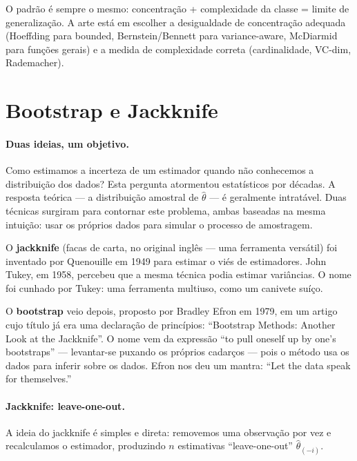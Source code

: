 \documentclass{tufte-handout}
\begin{document}
\begin{remark}
    O padrão é sempre o mesmo: concentração + complexidade da classe = limite de generalização. A arte está em escolher a desigualdade de concentração adequada (Hoeffding para bounded, Bernstein/Bennett para variance-aware, McDiarmid para funções gerais) e a medida de complexidade correta (cardinalidade, VC-dim, Rademacher).
\end{remark}

\section{Bootstrap e Jackknife}

\paragraph{Duas ideias, um objetivo.}

Como estimamos a incerteza de um estimador quando não conhecemos a distribuição dos dados? Esta pergunta atormentou estatísticos por décadas. A resposta teórica --- a distribuição amostral de $\hat{\theta}$ --- é geralmente intratável. Duas técnicas surgiram para contornar este problema, ambas baseadas na mesma intuição: usar os próprios dados para simular o processo de amostragem.

O \textbf{jackknife} (facas de carta, no original inglês --- uma ferramenta versátil) foi inventado por Quenouille em 1949 para estimar o viés de estimadores. John Tukey, em 1958, percebeu que a mesma técnica podia estimar variâncias. O nome foi cunhado por Tukey: uma ferramenta multiuso, como um canivete suíço.

O \textbf{bootstrap} veio depois, proposto por Bradley Efron em 1979, em um artigo cujo título já era uma declaração de princípios: ``Bootstrap Methods: Another Look at the Jackknife''. O nome vem da expressão ``to pull oneself up by one's bootstraps'' --- levantar-se puxando os próprios cadarços --- pois o método usa os dados para inferir sobre os dados. Efron nos deu um mantra: ``Let the data speak for themselves.''

\paragraph{Jackknife: leave-one-out.}

A ideia do jackknife é simples e direta: removemos uma observação por vez e recalculamos o estimador, produzindo $n$ estimativas ``leave-one-out'' $\hat{\theta}_{(-i)}$.
\end{document}
